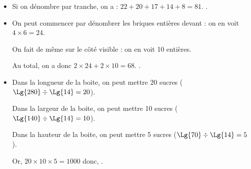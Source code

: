 \vfill



   \begin{itemize}
      \item Si on dénombre par tranche, on a : $22+20+17+14+8 =81$. .
      \item On peut commencer par dénombrer les briques entières devant : on en voit $4\times6 =24$. \par
         On fait de même sur le côté visible : on en voit 10 entières. \par
         Au total, on a donc $2\times24+2\times10 =68$. .
      \item Dans la longueur de la boite, on peut mettre 20 sucres ($\Lg{280}\div\Lg{14} =20$). \par
         Dans la largeur de la boite, on peut mettre 10 sucres ($\Lg{140}\div\Lg{14} =10$). \par
         Dans la hauteur de la boite, on peut mettre 5 sucres ($\Lg{70}\div\Lg{14} =5$). \par
         Or, $20\times10\times5 =\num{1000}$ donc, .
   \end{itemize}

\vfill



